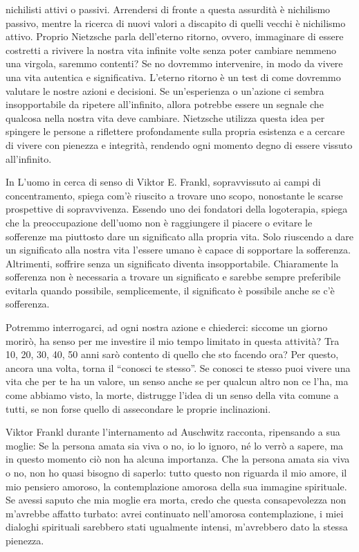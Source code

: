 \documentclass[12pt]{book} %
\begin{document}
nichilisti attivi o passivi. Arrendersi di fronte a questa assurdità è nichilismo passivo, mentre la ricerca di nuovi
valori a discapito di quelli vecchi è nichilismo attivo.
Proprio Nietzsche parla dell'eterno ritorno, ovvero, immaginare di essere costretti a rivivere la nostra vita infinite volte senza poter cambiare nemmeno una virgola, saremmo contenti? Se no dovremmo intervenire, in modo da vivere una vita autentica e significativa. L'eterno ritorno è un test di come dovremmo valutare le nostre azioni e decisioni. Se un'esperienza o un'azione ci sembra insopportabile da ripetere all'infinito, allora potrebbe essere un segnale che qualcosa nella nostra vita deve cambiare. Nietzsche utilizza questa idea per spingere le persone a riflettere profondamente sulla propria esistenza e a cercare di vivere con pienezza e integrità, rendendo ogni momento degno di essere vissuto all'infinito.

In L'uomo in cerca di senso di Viktor E. Frankl, sopravvissuto ai campi di
concentramento, spiega com'è riuscito a trovare uno scopo, nonostante le scarse prospettive di
sopravvivenza. Essendo uno dei fondatori della logoterapia, spiega che la preoccupazione dell'uomo non è raggiungere il
piacere o evitare le sofferenze ma piuttosto dare un significato alla propria vita. Solo riuscendo a dare un
significato alla nostra vita l'essere umano è capace di sopportare la sofferenza. Altrimenti,
soffrire senza un significato diventa insopportabile. Chiaramente la sofferenza non è necessaria a trovare un
significato e sarebbe sempre preferibile evitarla quando possibile, semplicemente, il significato è possibile anche se c'è sofferenza.

Potremmo interrogarci, ad ogni nostra azione e chiederci: siccome un giorno morirò, ha senso per me investire
il mio tempo limitato in questa attività? Tra 10, 20, 30, 40, 50 anni sarò contento di quello che sto facendo ora?
Per questo, ancora una volta, torna il “conosci te stesso”. Se conosci te
stesso puoi vivere una vita che per te ha un valore, un senso anche se per qualcun altro non ce
l'ha, ma come abbiamo visto, la morte, distrugge l'idea di un senso della
vita comune a tutti, se non forse quello di assecondare le proprie inclinazioni. 

Viktor Frankl durante l'internamento ad Auschwitz racconta, ripensando a sua moglie: Se la persona
amata sia viva o no, io lo ignoro, né lo verrò a sapere, ma in questo momento ciò non ha alcuna importanza. Che la
persona amata sia viva o no, non ho quasi bisogno di saperlo: tutto questo non riguarda il mio amore, il mio pensiero
amoroso, la contemplazione amorosa della sua immagine spirituale. Se avessi saputo che mia moglie era morta, credo che
questa consapevolezza non m'avrebbe affatto turbato: avrei continuato nell'amorosa contemplazione, i miei dialoghi
spirituali sarebbero stati ugualmente intensi, m'avrebbero dato la stessa pienezza. 
\end{document}
